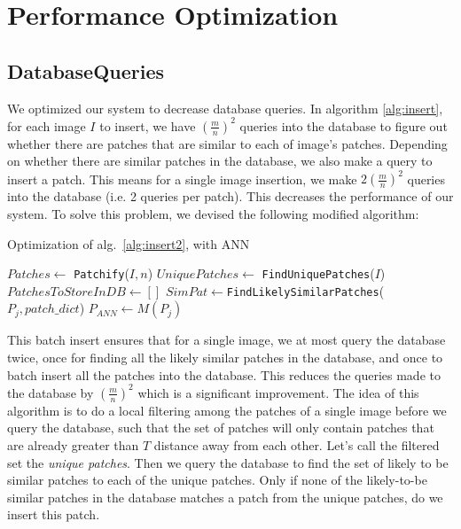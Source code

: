 \section{Performance Optimization}\label{sec:opt}



\subsection{DatabaseQueries}

We optimized our system to decrease database queries. In algorithm \ref{alg:insert}, for each image $I$ to insert, we have $\left(\frac{m}{n}\right)^2$ queries into the database to figure out whether there are patches that are similar to each of image's patches. Depending on whether there are similar patches in the database, we also make a query to insert a patch. This means for a single image insertion, we make $2\left(\frac{m}{n}\right)^2$ queries into the database (i.e. 2 queries per patch). This decreases the performance of our system. To solve this problem, we devised the following modified algorithm:

\begin{algorithm}
    \caption{Optimization of alg.~\ref{alg:insert2}, with ANN}
    \label{alg:optimized}
\begin{algorithmic}[1]
\State $Patches \leftarrow $ \texttt{Patchify}($I,n$)
\State $UniquePatches \leftarrow$ \texttt{FindUniquePatches}($I$)
\State $PatchesToStoreInDB \leftarrow []$
\State $SimPat \leftarrow $\texttt{FindLikelySimilarPatches}($P_j,patch\_dict$)
\State $P_{ANN} \leftarrow M(P_j)$
\EndIf
\EndFor
{}
\vspace{3mm}
\end{algorithmic}
\end{algorithm}

This batch insert ensures that for a single image, we at most query the database twice, once for finding all the likely similar patches in the database, and once to batch insert all the patches into the database. This reduces the queries made to the database by $\left(\frac{m}{n}\right)^2$ which is a significant improvement.
The idea of this algorithm is to do a local filtering among the patches of a single image before we query the database, such that the set of patches will only contain patches that are already greater than $T$ distance away from each other.  Let's call the filtered set the \emph{unique patches}. Then we query the database to find the set of likely to be similar patches to each of the unique patches. Only if none of the likely-to-be similar patches in the database matches a patch from the unique patches, do we insert this patch.
